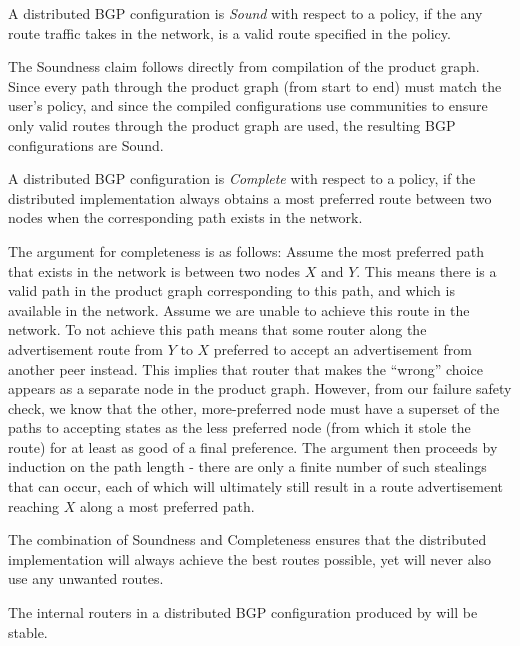 \begin{defn}
A distributed BGP configuration is \textit{Sound} with respect to a \sysname policy, if the any route traffic takes in the network, is a valid route specified in the policy.
\end{defn}

The Soundness claim follows directly from compilation of the product graph. Since every path through the product graph (from start to end) must match the user's policy, and since the compiled configurations use communities to ensure only valid routes through the product graph are used, the resulting BGP configurations are Sound. 

\begin{defn}
A distributed BGP configuration is \textit{Complete} with respect to a \sysname policy, if the distributed implementation always obtains a most preferred route between two nodes when the corresponding path exists in the network.
\end{defn}

The argument for completeness is as follows: Assume the most preferred path that exists in the network is between two nodes $X$ and $Y$.  This means there is a valid path in the product graph corresponding to this path, and which is available in the network. 
Assume we are unable to achieve this route in the network. To not achieve this path means that some router along the advertisement route from $Y$ to $X$ preferred to accept an advertisement from another peer instead. This implies that router that makes the ``wrong'' choice appears as a separate node in the product graph. However, from our failure safety check, we know that the other, more-preferred node must have a superset of the paths to accepting states as the less preferred node (from which it stole the route) for at least as good of a final preference. The argument then proceeds by induction on the path length - there are only a finite number of such stealings that can occur, each of which will ultimately still result in a route advertisement reaching $X$ along a most preferred path.

The combination of Soundness and Completeness ensures that the distributed implementation will always achieve the best routes possible, yet will never also use any unwanted routes. 

\begin{defn}
The internal routers in a distributed BGP configuration produced by \sysname will be stable. 
\end{defn}

